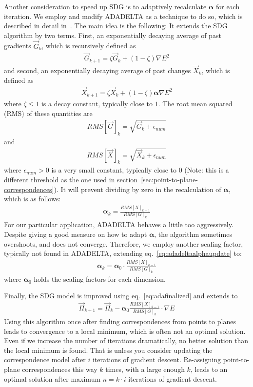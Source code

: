 Another consideration to speed up SDG is to adaptively recalculate $\boldsymbol\alpha$ for each iteration. 
We employ and modify ADADELTA as a technique to do so, which is described in detail in~\cite{zeiler2012adadelta}.
The main idea is the following:
It extends the SDG algorithm by two terms.
First, an exponentially decaying average of past gradients $\vec{G}_k$, which is recursively defined as
\begin{align}
    \vec{G}_{k+1} = \zeta \vec{G}_{k} + (1 - \zeta) {\nabla E}^2
\end{align}
and second, an exponentially decaying average of past changes $\vec{X}_k$, which is defined as
\begin{align}
    \vec{X}_{k+1} = \zeta \vec{X}_{k} + (1 - \zeta) {\boldsymbol\alpha \nabla E}^2
\end{align}
where $\zeta \leq 1$ is a decay constant, typically close to $1$.
The root mean squared (RMS) of these quantities are
\begin{align}
    RMS[\vec{G}]_{k} = \sqrt{\vec{G}_{k} + \epsilon_{num}}
\end{align}
and 
\begin{align}
    RMS[\vec{X}]_{k} = \sqrt{\vec{X}_{k} + \epsilon_{num}}
\end{align}
where $\epsilon_{num} > 0$ is a very small constant, typically close to $0$ (Note: this is a different threshold as the one used in section~\ref{sec:point-to-plane-correspondences}).
It will prevent dividing by zero in the recalculation of $\boldsymbol\alpha$, which is as follows:
\begin{align}
    \boldsymbol\alpha_{k} = \frac{RMS[X]_{k-1}}{RMS[G]_{k}}
    \label{eq:adadeltaalphaupdate}
\end{align} 
For our particular application, ADADELTA behaves a little too aggressively.
Despite giving a good measure on how to adapt $\boldsymbol\alpha$, the algorithm sometimes overshoots, and does not converge.
Therefore, we employ another scaling factor, typically not found in ADADELTA, extending eq.~\eqref{eq:adadeltaalphaupdate} to:
\begin{align}
    \boldsymbol\alpha_{k} = \boldsymbol\alpha_0 \cdot \frac{RMS[X]_{k-1}}{RMS[G]_{k}}
    \label{eq:adafinalized}
\end{align} 
where $\boldsymbol\alpha_0 $ holds the scaling factors for each dimension.

Finally, the SDG model is improved using eq.~\eqref{eq:adafinalized} and extends to 
\begin{align}
    \vec{\Pi}_{k+1} = \vec{\Pi}_{k} - \boldsymbol\alpha_0  \frac{RMS[X]_{k-1}}{RMS[G]_{k}} \cdot \nabla E
\end{align}
Using this algorithm once after finding correspondences from points to planes leads to convergence to a local minimum, which is often not an optimal solution.
Even if we increase the number of iterations dramatically, no better solution than the local minimum is found.
That is unless you consider updating the correspondence model after $i$ iterations of gradient descent.
Re-assigning point-to-plane correspondences this way $k$ times, with a large enough $k$, leads to an optimal solution after maximum $n = k\cdot i$ iterations of gradient descent.


